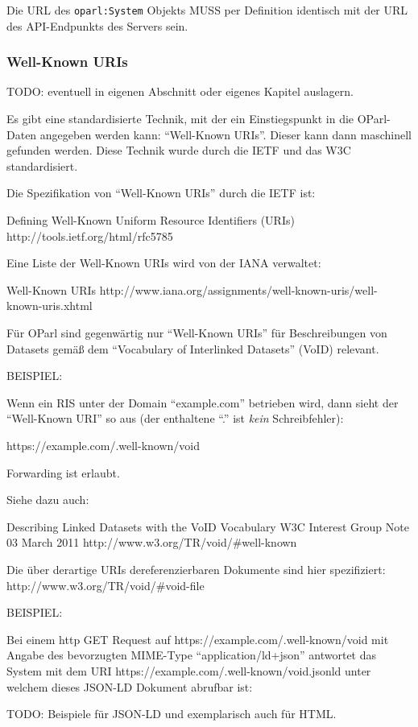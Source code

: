 \documentclass[,a4paper]{article}
\begin{document}
Die URL des \texttt{oparl:System} Objekts MUSS per Definition identisch
mit der URL des API-Endpunkts des Servers sein.

\subsubsection{Well-Known URIs}\label{well-known-uris}

TODO: eventuell in eigenen Abschnitt oder eigenes Kapitel auslagern.

Es gibt eine standardisierte Technik, mit der ein Einstiegspunkt in die
OParl-Daten angegeben werden kann: ``Well-Known URIs''. Dieser kann dann
maschinell gefunden werden. Diese Technik wurde durch die IETF und das
W3C standardisiert.

Die Spezifikation von ``Well-Known URIs'' durch die IETF ist:

Defining Well-Known Uniform Resource Identifiers (URIs)
http://tools.ietf.org/html/rfc5785

Eine Liste der Well-Known URIs wird von der IANA verwaltet:

Well-Known URIs
http://www.iana.org/assignments/well-known-uris/well-known-uris.xhtml

Für OParl sind gegenwärtig nur ``Well-Known URIs'' für Beschreibungen
von Datasets gemäß dem ``Vocabulary of Interlinked Datasets'' (VoID)
relevant.

BEISPIEL:

Wenn ein RIS unter der Domain ``example.com'' betrieben wird, dann sieht
der ``Well-Known URI'' so aus (der enthaltene ``.'' ist \emph{kein}
Schreibfehler):

https://example.com/.well-known/void

Forwarding ist erlaubt.

Siehe dazu auch:

Describing Linked Datasets with the VoID Vocabulary W3C Interest Group
Note 03 March 2011 http://www.w3.org/TR/void/\#well-known

Die über derartige URIs dereferenzierbaren Dokumente sind hier
spezifiziert: http://www.w3.org/TR/void/\#void-file

BEISPIEL:

Bei einem http GET Request auf https://example.com/.well-known/void mit
Angabe des bevorzugten MIME-Type ``application/ld+json'' antwortet das
System mit dem URI https://example.com/.well-known/void.jsonld unter
welchem dieses JSON-LD Dokument abrufbar ist:

TODO: Beispiele für JSON-LD und exemplarisch auch für HTML.
\end{document}
